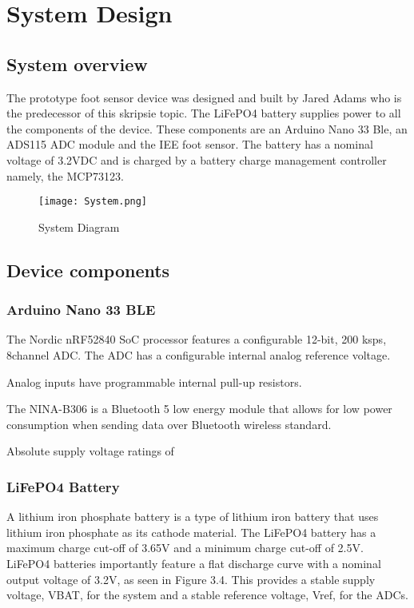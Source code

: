 \graphicspath{{systemdesign/fig/}}
\chapter{System Design}
\label{chap:systemdesign}

\section{System overview}

The prototype foot sensor device was designed and built by Jared Adams who is the predecessor of this skripsie topic.
The LiFePO4 battery supplies power to all the components of the device. These components are an Arduino Nano 33 Ble, an ADS115 ADC module and the IEE foot sensor. The battery has a nominal voltage of 3.2VDC and is charged by a battery charge management controller namely, the MCP73123.


\begin{figure}[!h]
    \centering
    \texttt{[image: System.png]}
    \caption{System Diagram}
    \label{fig:sysdiagram}
\end{figure}
\section{Device components}

\subsection{Arduino Nano 33 BLE}
The Nordic nRF52840 SoC processor features a configurable 12-bit, 200 ksps, 8channel ADC.
The ADC has a configurable internal analog reference voltage.

Analog inputs have programmable internal pull-up resistors.


The NINA-B306 is a Bluetooth 5 low energy module that allows for low power
consumption when sending data over Bluetooth wireless standard.


Absolute supply voltage ratings of


\subsection{LiFePO4 Battery}
A lithium iron phosphate battery is a type of lithium iron battery that uses lithium iron
phosphate as its cathode material. The LiFePO4 battery has a maximum charge cut-off of
3.65V and a minimum charge cut-off of 2.5V. LiFePO4 batteries importantly feature a
flat discharge curve with a nominal output voltage of 3.2V, as seen in Figure 3.4. This
provides a stable supply voltage, VBAT, for the system and a stable reference voltage, Vref,
for the ADCs.
